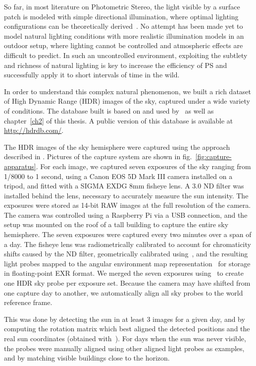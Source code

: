 So far, in most literature on Photometric Stereo, the light visible by a surface patch is modeled with simple directional illumination, where optimal lighting configurations can be theoretically derived~\cite{drbohlav-iccv-05,klaudiny-prl-14,shen-pg-14}. No attempt has been made yet to model natural lighting conditions with more realistic illumination models in an outdoor setup, where lighting cannot be controlled and atmospheric effects are difficult to predict. In such an uncontrolled environment, exploiting the subtlety and richness of natural lighting is key to increase the efficiency of PS and successfully apply it to short intervals of time in the wild.

In order to understand this complex natural phenomenon, we built a rich dataset of High Dynamic Range (HDR) images of the sky, captured under a wide variety of conditions. The database built is based on and used by~\cite{lalonde-3dv-14,holdgeoffroy-iccp-15,holdgeoffroy-3dv-15} as well as chapter~\ref{ch2} of this thesis. A public version of this database is available at \url{http://hdrdb.com/}.

The HDR images of the sky hemisphere were captured using the approach described in \cite{stumpfel-afrigraph-04}. Pictures of the capture system are shown in fig.~\ref{fig:capture-apparatus}. For each image, we captured seven exposures of the sky ranging from 1/8000 to 1 second, using a Canon EOS 5D Mark III camera installed on a tripod, and fitted with a SIGMA EXDG 8mm fisheye lens. A 3.0 ND filter was installed behind the lens, necessary to accurately measure the sun intensity. The exposures were stored as 14-bit RAW images at the full resolution of the camera. The camera was controlled using a Raspberry Pi via a USB connection, and the setup was mounted on the roof of a tall building to capture the entire sky hemisphere. The seven exposures were captured every two minutes over a span of a day. The fisheye lens was radiometrically calibrated to account for chromaticity shifts caused by the ND filter, geometrically calibrated using~\cite{scaramuzza-iros-09}, and the resulting light probes mapped to the angular environment map representation~\cite{reinhard-book-05} for storage in floating-point EXR format. We merged the seven exposures using~\cite{debevec-siggraph-97} to create one HDR sky probe per exposure set. Because the camera may have shifted from one capture day to another, we automatically align all sky probes to the world reference frame.

This was done by detecting the sun in at least 3 images for a given day, and by computing the rotation matrix which best aligned the detected positions and the real sun coordinates (obtained with~\cite{reda-se-04}). For days when the sun was never visible, the probes were manually aligned using other aligned light probes as examples, and by matching visible buildings close to the horizon.

